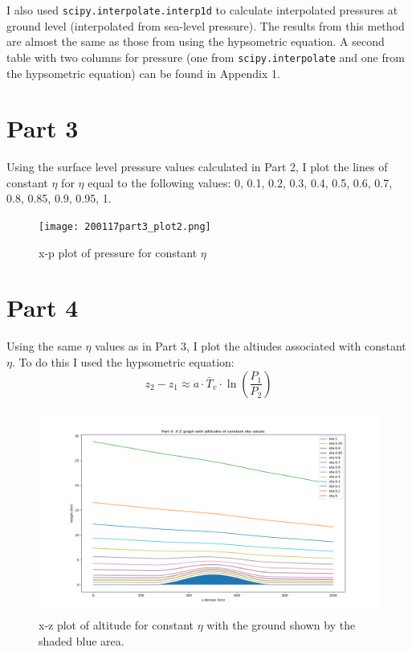 \documentclass[12pt]{article}
\newcommand{\code}[1]{\texttt{#1}}
\begin{document}
I also used \code{scipy.interpolate.interp1d} to calculate interpolated pressures at ground level 
(interpolated from sea-level pressure). The results from this method are almost the same as those from using the hypsometric
equation. A second table with two columns for pressure (one from \code{scipy.interpolate} and one from the 
hypsometric equation) can be found in Appendix 1.


\section*{Part 3}

Using the surface level pressure values calculated in Part 2, I plot the lines of constant $ \eta $ 
for $ \eta $ equal to the following values: 0, 0.1, 0.2, 0.3, 0.4, 0.5, 0.6, 0.7, 0.8, 0.85, 0.9, 0.95, 1.


\begin{figure}[h]
    \centering
    \texttt{[image: 200117part3\_plot2.png]}
    \caption{x-p plot of pressure for constant $ \eta $}
    \label{fig:mesh1}
\end{figure}


\section*{Part 4}

Using the same $ \eta $ values as in Part 3, I plot the altiudes associated with constant $ \eta $.
To do this I used the hypsometric equation:
$$
z_{2}-z_{1} \approx a \cdot \bar{T}_{v} \cdot \ln \left(\frac{P_{1}}{P_{2}}\right)
$$


\begin{figure}[h]
    \centering
    \includegraphics[width=\textwidth]{200120part4_plot.png}
    \caption{x-z plot of altitude for constant $ \eta $ with the ground shown by the shaded blue area.}
    \label{fig:mesh1}
\end{figure}
\end{document}

